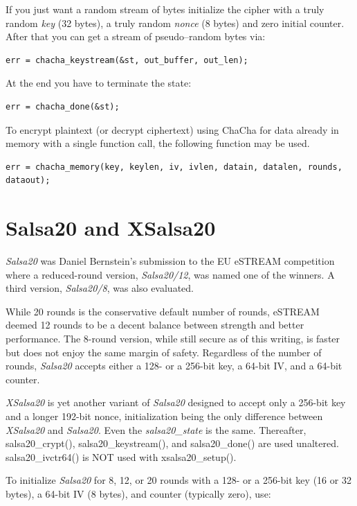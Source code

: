 \documentclass[synpaper]{book}
\newcommand{\mysection}[1]    %
	{                   %
	\section{#1}
   \markboth{\textsf{www.libtom.net}}{\thesection ~ {#1}}
	}
\begin{document}
If you just want a random stream of bytes initialize the cipher with a truly random \textit{key} (32 bytes),
a truly random \textit{nonce} (8 bytes) and zero initial counter. After that you can get a stream of pseudo--random
bytes via:
\begin{verbatim}
err = chacha_keystream(&st, out_buffer, out_len);
\end{verbatim}

At the end you have to terminate the state:
\begin{verbatim}
err = chacha_done(&st);
\end{verbatim}

To encrypt plaintext (or decrypt ciphertext) using ChaCha for data already in
memory with a single function call, the following function may be used.
\begin{verbatim}
err = chacha_memory(key, keylen, iv, ivlen, datain, datalen, rounds, dataout);
\end{verbatim}

\mysection{Salsa20 and XSalsa20}

\textit{Salsa20} was Daniel Bernstein's submission to the EU eSTREAM
competition where a reduced-round version, \textit{Salsa20/12}, was named
one of the winners.  A third version, \textit{Salsa20/8}, was also evaluated.
\vspace{1mm}

While 20 rounds is the conservative default number of rounds, eSTREAM deemed
12 rounds to be a decent balance between strength and better performance.
The 8-round version, while still secure as of this writing, is faster but
does not enjoy the same margin of safety.  Regardless of the number of rounds,
\textit{Salsa20} accepts either a 128- or a 256-bit key, a 64-bit IV, and a
64-bit counter.
\vspace{1mm}

\textit{XSalsa20} is yet another variant of \textit{Salsa20} designed to accept
only a 256-bit key and a longer 192-bit nonce, initialization being the only
difference between \textit{XSalsa20} and \textit{Salsa20}.  Even the
\textit{salsa20\_state} is the same.  Thereafter, salsa20\_crypt(),
salsa20\_keystream(), and salsa20\_done() are used unaltered.
salsa20\_ivctr64() is NOT used with xsalsa20\_setup().
\vspace{1mm}

To initialize \textit{Salsa20} for 8, 12, or 20 rounds with a 128- or a
256-bit key (16 or 32 bytes), a 64-bit IV (8 bytes), and counter (typically
zero), use:
\end{document}
